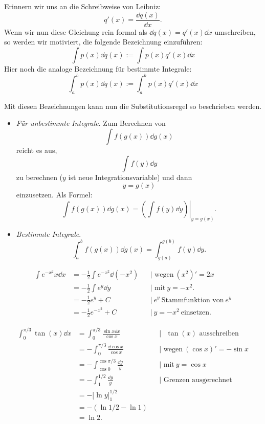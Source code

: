 \begin{bem} 
	Erinnern wir uns an die Schreibweise von Leibniz: 
	\[
		q'(x) = \frac{\dd q(x)} {\dd x}. 
	\]
	Wenn wir nun diese Gleichung rein formal als $\dd q(x)  = q'(x) \dd x$ umschreiben, so werden wir motiviert, die folgende Bezeichnung einzuführen: 
	\[
		\int p(x) \dd q(x) := \int p(x) q'(x) \dd x 
	\]
	Hier noch die analoge Bezeichnung für bestimmte Integrale: 
	\[
		\int_a^b p(x) \dd q(x) := \int_a^b p(x) q'(x) \dd x
	\]
	
	Mit diesen Bezeichnungen kann nun die Substitutionsregel so beschrieben werden. 
	\begin{itemize}
		\item \emph{Für unbestimmte Integrale}. Zum Berechnen von \[
		\int f(g(x)) \dd g(x)
		\] reicht es aus, 
		\[ \int f(y) \dd y
		\] zu berechnen ($y$ ist neue Integrationsvariable) und dann \[ y=g(x) \] einzusetzen. Als Formel: 
		\[
			\int f(g(x)) \dd g(x) = \left. \left( \int f(y) \dd y \right) \right|_{y = g(x)}.
		\] 
		\item \emph{Bestimmte Integrale}. 
		\[
			\int_a^b f(g(x)) \dd g(x) = \int_{g(a)}^{g(b)} f(y) \dd y. 
		\] 
	\end{itemize} 
\end{bem} 

\begin{bsp}
	\begin{align*}
		\int e^{-x^2} x \dd x & = -\frac{1}{2} \int e^{-x^2} \dd (- x^2)  & & | \text{ wegen} \ (x^2)' = 2 x
		\\ & = - \frac{1}{2} \int e^{y} \dd y & & | \text{ mit} \ y=-x^2.
		\\ & =  - \frac{1}{2} e^y + C & & | \ e^y \ \text{Stammfunktion von}  \ e^y
		\\ & =  - \frac{1}{2} e^{-x^2} + C 	 & & | \ y=-x^2 \ \text{einsetzen}.
	\end{align*} 
\end{bsp} 

\begin{bsp}
	\begin{align*}
		\int_0^{\pi/3} \tan(x) \dd x & = \int_{0}^{\pi/3} \frac{\sin x \dd x}{\cos x} & &|\text{ $\tan(x)$ ausschreiben}
		\\ & = - \int_0^{\pi/3} \frac{\dd \cos x}{\cos x}  & &|\text{ wegen} \ (\cos x)' =-\sin x 
		\\ & = - \int_{\cos 0}^{\cos \pi/3} \frac{\dd y}{y}  & &|\text{ mit}\  y=\cos x
		\\ & = - \int_1^{1/2} \frac{\dd y}{y} & &| \text{ Grenzen ausgerechnet}
		\\ & =  - \biggl[ \ln y \biggr]_1^{1/2} 
		\\ & = - (\ln 1/2 - \ln 1)
		\\ & = \ln 2.
	\end{align*}
\end{bsp} 




